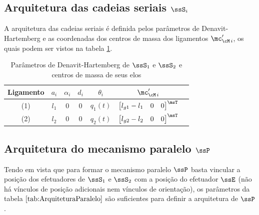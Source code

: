 \documentclass[]{politex}
\begin{document}
\subsection{Arquitetura das cadeias seriais $\ssS_i$}

A arquitetura das cadeias seriais \'e definida pelos parâmetros de Denavit-Hartemberg e as coordenadas dos centros de massa dos ligamentos $\mc'_{\cM\,i}$, os quais podem ser vistos na tabela \ref{tab:DH}.

\begin{table}[H]
\begin{center}
\caption{Parâmetros de Denavit-Hartemberg de $\ssS_1$ e $\ssS_2$ e centros de massa de seus elos}
\begin{tabular}{|c|c|c|c|c|c|c|} 
	\hline
	\rule[-2mm]{0mm}{6mm}
	Ligamento & $a_i$ & $\alpha_i$ & $d_i$ & $\theta_i$ & $\mc'_{\cM\,i}$ \\
	\hline
	\rule[-2mm]{0mm}{6mm}
	(1) & $l_1$ & $0$ & $0$ & $q_1(t)$ & $\begin{bmatrix} l_{g1} - l_1 & 0 & 0 \end{bmatrix}^\msT$ \\
	\rule[-1mm]{0mm}{5mm}
	(2) & $l_2$ & $0$ & $0$ & $q_2(t)$ & $\begin{bmatrix} l_{g2} - l_2 & 0 & 0 \end{bmatrix}^\msT$ \\
	\hline
\end{tabular}
\label{tab:DH}
\end{center}
\end{table}

\subsection{Arquitetura do mecanismo paralelo $\ssP$}
Tendo em vista que para formar o mecanismo paralelo $\ssP$ basta vincular a posição dos efetuadores de $\ssS_1$ e $\ssS_2$ com a posição do efetuador $\ssE$ (não há vínculos de posição adicionais nem vínculos de orientação), os parâmetros da tabela $\ref{tab:ArquiteturaParalelo}$ são suficientes para definir a arquitetura de $\ssP$.
\end{document}
